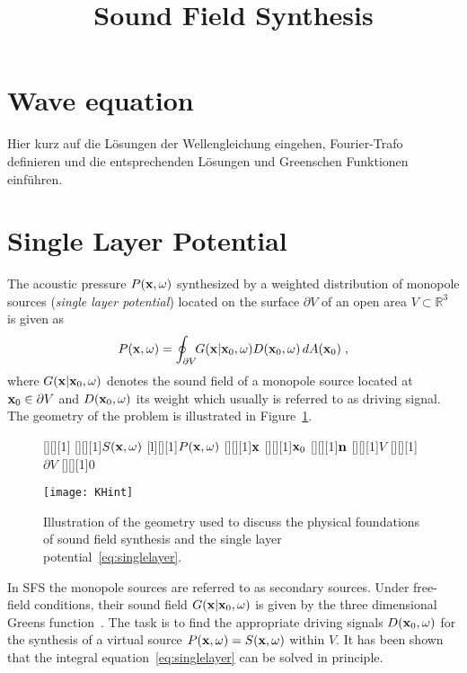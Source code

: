 \documentclass{article}
\title{Sound Field Synthesis}
\begin{document}
\maketitle

\section{Wave equation}

Hier kurz auf die Lösungen der Wellengleichung eingehen, Fourier-Trafo
definieren und die entsprechenden Lösungen und Greenschen Funktionen einführen.

\section{Single Layer Potential}
\label{sec:singlelayerpotential}

The acoustic pressure $P(  \mathbf{x}  ,\omega)$ synthesized by a weighted distribution
of monopole sources (\emph{single layer potential}) located on the
surface $\partial V$ of an open area $V \subset \mathbb{R}^3$ is given as
\begin{equation}
    P(  \mathbf{x}  ,\omega) = \oint_{\partial V} \!\! G(  \mathbf{x}  |  \mathbf{x}  _0,\omega) D(  \mathbf{x}  _0,\omega) \, 
    dA(  \mathbf{x}  _0) \;,
    \label{eq:singlelayer}
\end{equation}
where $G(  \mathbf{x}  |  \mathbf{x}  _0,\omega)$ denotes the sound field of a monopole
source located at $  \mathbf{x}  _0 \in \partial V$ and $D(  \mathbf{x}  _0,\omega)$ its weight which usually
is referred to as driving signal. The geometry of the problem is illustrated in
Figure~\ref{fig:KHint}.
\begin{figure}
    [][][1]{}
    [][][1]{$S(  \mathbf{x}  ,\omega)$}
    [l][][1]{$P(  \mathbf{x}  ,\omega)$}
    [][][1]{$  \mathbf{x}  $}
    [][][1]{$  \mathbf{x}  _0$}
    [][][1]{$  \mathbf{n}  $}
    [][][1]{$V$}
    [][][1]{$\partial V$}
    [][][1]{$0$}
    \centerline{\texttt{[image: KHint]}}
    \caption{Illustration of the geometry used to discuss the physical foundations of sound field synthesis
    and the single layer potential~\eqref{eq:singlelayer}.}
    \label{fig:KHint}
\end{figure}
In SFS the monopole sources are referred to as secondary sources. Under free-field conditions,
their sound field $G(  \mathbf{x}  |  \mathbf{x}  _0,\omega)$ is given by the three dimensional Greens
function~\cite{Williams1999}. The task is to find the appropriate driving
signals $D(  \mathbf{x}  _0,\omega)$ for the synthesis of a virtual source $P(  \mathbf{x}  ,\omega) = S(  \mathbf{x}  ,\omega)$
within $V$. It has been shown~\cite{Fazi2009} that the integral equation~\eqref{eq:singlelayer}
can be solved in principle.
\end{document}
